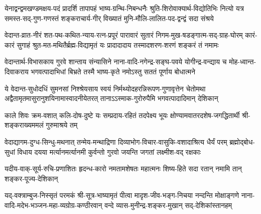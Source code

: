 
\fourlineindentedshloka
{येनाद्वन्द्वमखण्डमक्षय-पदं प्रादर्शि तापापहं}
{भाष्य-ग्रन्थि-निबन्धनैः श्रुति-शिरोवाक्यार्थ-विद्योतिभिः}
{नित्यो यत्र समस्त-सद्-गुण-गणस्तं शङ्कराचार्य-गीर्}
{विख्यातं मुनि-मौलि-लालित-पद-द्वन्द्वं सदा संश्रये}


\fourlineindentedshloka
{वेदान्त-व्रात-नीरं शत-पथ-कथित-न्याय-रत्न-प्रपूरं}
{पारावारं सुतारं निगम-मुख-षडङ्गात्म-सद्-ग्राह-घोरम्}
{कारं-कारं सुगाहं श्रुत-मत-मथितैर्ब्रह्म-विद्यामृतं यः}
{प्रादादादाय तस्मादशरण-शरणं शङ्करं तं नमामः}


\fourlineindentedshloka
{वेदान्तार्थ-विभासकाय गुरवे शान्ताय संन्यासिने}
{नाना-वादि-नगेन्द्र-सङ्घ-पवये योगीन्द्र-वन्द्याय च}
{मोह-ध्वान्त-दिवाकराय भगवत्पादाभिधां बिभ्रते}
{तस्मै भाष्य-कृते नमोऽस्तु सततं पूर्णाय बोधात्मने}


\fourlineindentedshloka
{ये वेदान्त-सुधोदधिं सुमनसां निश्श्रेयसाय स्वयं}
{निर्मथ्योदहरन्निरूपण-गुणावृत्तेन चेतोमथा}
{अद्वैतामृतमासुरानुशयिनामास्वादनीयेतरत्}
{तानाऽऽस्माक-गुरोरुपैमि भगवत्पादादिमान् देशिकान्}


\fourlineindentedshloka
{काले शिवः क्रम-वशात् कलि-दोष-दुष्टे}
{यः सम्प्रदाय-रहितं तदपेक्ष्य भूयः}
{क्षोण्यामवातरदशेष-जगद्धितार्थी}
{श्री-शङ्कराख्यममलं गुरुमाश्रये तम्}


\fourlineindentedshloka
{वेदाद्यागम-दुग्ध-सिन्धु-मथनात् तन्मेय-मन्थाद्रिणा}
{दिव्याभोग-विचार-वासुकि-वशादाश्रित्य धैर्यं परम्}
{ब्रह्मोद्बोध-सुधां विधाय दयया मर्त्यानमर्त्यानमी}
{कुर्वन्तो गुरवो जयन्ति जगतां लक्ष्मीश-वद् रक्षकाः}


\fourlineindentedshloka
{यदीय-वाक्-सूर्य-रुचि-प्रणाशितः}
{हृदन्ध-कारो नमतामशेषतः}
{महात्मनः शिष्य-हिते सदा रतान्}
{नमामि तान् शङ्कर-पूज्य-देशिकान्}


\fourlineindentedshloka
{यद्-वक्त्राम्बुज-निस्सृतं परमकं श्री-सूत्र-भाष्यामृतं}
{पीत्वा मादृश-जीव-भङ्ग-निचया नन्दन्ति मोक्षाङ्गणे}
{नाना-वादि-मदेभ-भञ्जन-महा-व्यग्रोग्र-कण्ठीरवान्}
{वन्दे व्यास-मुनीन्द्र-शङ्कर-मुखान् सद्-देशिकांस्तानहम्}

